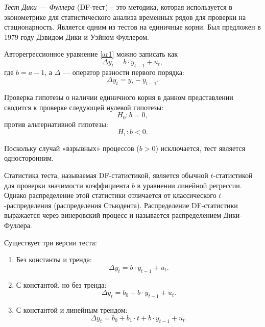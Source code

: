 \documentclass[a4paper, 14pt]{extreport}
\numberwithin{equation}{subsection}
\numberwithin{equation}{section}
\begin{document}
	\textit{Тест Дики — Фуллера} (DF-тест) -- это методика, которая используется в эконометрике для статистического анализа временных рядов для проверки на стационарность. Является одним из тестов на единичные корни. Был предложен в 1979 году Дэвидом Дики и Уэйном Фуллером.
	
	Авторегрессионное уравнение \eqref{ar1} можно записать как
	\begin{equation}
		\Delta y_t = b \cdot y_{t-1} + u_t,
	\end{equation}
	где $b = a - 1$, а $\Delta$ — оператор разности первого порядка:
	\begin{equation*}
		\Delta y_t = y_t - y_{t-1}.
	\end{equation*}
	
	Проверка гипотезы о наличии единичного корня в данном представлении сводится к проверке следующей нулевой гипотезы:
	\begin{equation}
		H_0: b = 0,
	\end{equation}
	против альтернативной гипотезы:
	\begin{equation}
		H_1: b < 0.
	\end{equation}
	
	Поскольку случай «взрывных» процессов ($b > 0$) исключается, тест является односторонним.
	
	Статистика теста, называемая DF-статистикой, является обычной $t$-статистикой для проверки значимости коэффициента $b$ в уравнении линейной регрессии. Однако распределение этой статистики отличается от классического $t$-распределения (распределения Стьюдента).
	Распределение DF-статистики выражается через винеровский процесс и называется распределением Дики-Фуллера.
	
	Существует три версии теста:
	\begin{enumerate}
		\item Без константы и тренда:
		\begin{equation}
			\Delta y_t = b \cdot y_{t-1} + u_t.
		\end{equation}
		\item С константой, но без тренда:
		\begin{equation}
			\Delta y_t = b_0 + b \cdot y_{t-1} + u_t.
		\end{equation}
		\item С константой и линейным трендом:
		\begin{equation}
			\Delta y_t = b_0 + b_1 \cdot t + b \cdot y_{t-1} + u_t.
		\end{equation}
	\end{enumerate}
	
\end{document}
